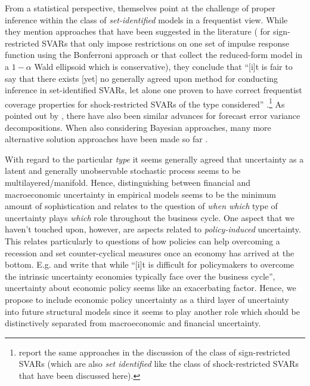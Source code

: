 \documentclass[a4paper,11pt,listof=nochaptergap,oneside,pointednumbers,bibtotoc,bigheadings,liststotoc,hidelinks]{scrbook}
\theoremstyle{mysatz}
\theoremstyle{mydefinition}
\theoremstyle{mytheorem}
\theoremstyle{mybemerkung}
\begin{document}
From a statistical perspective, \citet{ludvigsonetal:18, ludvigsonetal:19} themselves point at the challenge of proper inference within the class of \textit{set-identified} models in a frequentist view. While they mention approaches that have been suggested in the literature (\citet{granzieraetal:18} for sign-restricted SVARs that only impose restrictions on one set of impulse response function using the Bonferroni approach or \citet{gafarovetal:15} that collect the reduced-form model in a $1-\alpha$ Wald ellipsoid which is conservative), they conclude that ``[i]t is fair to say that there exists [yet] no generally agreed upon method for conducting inference in set-identified SVARs, let alone one proven to have correct frequentist coverage properties for shock-restricted SVARs of the type considered'' \citet[p. 10]{ludvigsonetal:20a}.\footnote{\citet{lutkepohlkilian:17} report the same approaches in the discussion of the class of sign-restricted SVARs (which are also \textit{set identified} like the class of shock-restricted SVARs that have been discussed here).} As pointed out by \citet{lutkepohlkilian:17}, there have also been similar advances for forecast error variance decompositions. When also considering Bayesian approaches, many more alternative solution approaches have been made so far \citep{lutkepohlkilian:17}.

With regard to the particular \textit{type} it seems generally agreed that uncertainty as a latent and generally unobservable stochastic process seems to be multilayered/manifold. Hence, distinguishing between financial and macroeconomic uncertainty in empirical models seems to be the minimum amount of sophistication and relates to the question of \textit{when which} type of uncertainty plays \textit{which} role throughout the business cycle. One aspect that we haven't touched upon, however, are aspects related to \textit{policy-induced} uncertainty. This relates particularly to questions of how policies can help overcoming a recession and set counter-cyclical measures once an economy has arrived at the bottom. E.g. \citet[p. 41]{bloometal:13} and \citet{IMF:12} write that while ``[i]t is difficult for policymakers to overcome the intrinsic uncertainty economies typically face over the business cycle'', uncertainty about economic policy seems like an exacerbating factor. Hence, we propose to include economic policy uncertainty as a third layer of uncertainty into future structural models since it seems to play another role which should be distinctively separated from macroeconomic and financial uncertainty.
\end{document}

